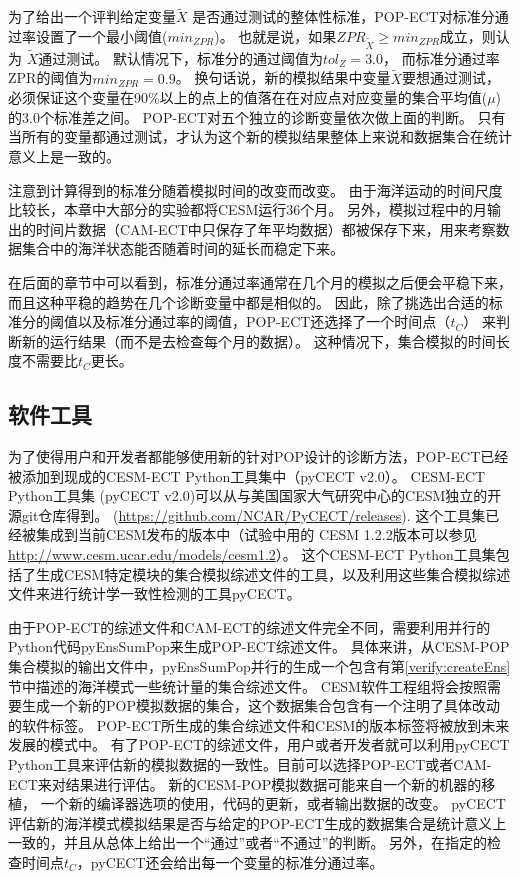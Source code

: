 为了给出一个评判给定变量$\tilde{X}$ 是否通过测试的整体性标准，POP-ECT对标准分通过率设置了一个最小阈值($min_{ZPR}$)。 
也就是说，如果$ZPR_{\tilde{X}} \geq min_{ZPR}$成立，则认为 $\tilde{X}$通过测试。
默认情况下，标准分的通过阈值为$tol_{Z} = 3.0$， 而标准分通过率ZPR的阈值为$min_{ZPR} = 0.9$。 
换句话说，新的模拟结果中变量$\tilde{X}$要想通过测试，必须保证这个变量在90$\%$以上的点上的值落在在对应点对应变量的集合平均值($\mu$) 的$3.0$个标准差之间。
POP-ECT对五个独立的诊断变量依次做上面的判断。 
只有当所有的变量都通过测试，才认为这个新的模拟结果整体上来说和数据集合在统计意义上是一致的。


 
注意到计算得到的标准分随着模拟时间的改变而改变。 
由于海洋运动的时间尺度比较长，本章中大部分的实验都将CESM运行36个月。
另外，模拟过程中的月输出的时间片数据（CAM-ECT中只保存了年平均数据）都被保存下来，用来考察数据集合中的海洋状态能否随着时间的延长而稳定下来。 



在后面的章节中可以看到，标准分通过率通常在几个月的模拟之后便会平稳下来，而且这种平稳的趋势在几个诊断变量中都是相似的。 
因此，除了挑选出合适的标准分的阈值以及标准分通过率的阈值，POP-ECT还选择了一个时间点（$t_C$）
来判断新的运行结果（而不是去检查每个月的数据）。 
这种情况下，集合模拟的时间长度不需要比$t_C$更长。 

\subsection{软件工具}
\label{verify:ECTsoft}

为了使得用户和开发者都能够使用新的针对POP设计的诊断方法，POP-ECT已经被添加到现成的CESM-ECT Python工具集中（pyCECT v2.0）。
CESM-ECT Python工具集 (pyCECT v2.0)可以从与美国国家大气研究中心的CESM独立的开源git仓库得到。 (\url{https://github.com/NCAR/PyCECT/releases}). 
这个工具集已经被集成到当前CESM发布的版本中（试验中用的 CESM 1.2.2版本可以参见\url{http://www.cesm.ucar.edu/models/cesm1.2}）。
这个CESM-ECT Python工具集包括了生成CESM特定模块的集合模拟综述文件的工具，以及利用这些集合模拟综述文件来进行统计学一致性检测的工具pyCECT。

由于POP-ECT的综述文件和CAM-ECT的综述文件完全不同，需要利用并行的Python代码pyEnsSumPop来生成POP-ECT综述文件。
具体来讲，从CESM-POP集合模拟的输出文件中，pyEnsSumPop并行的生成一个包含有第\ref{verify:createEns}节中描述的海洋模式一些统计量的集合综述文件。 
CESM软件工程组将会按照需要生成一个新的POP模拟数据的集合，这个数据集合包含有一个注明了具体改动的软件标签。
POP-ECT所生成的集合综述文件和CESM的版本标签将被放到未来发展的模式中。 
有了POP-ECT的综述文件，用户或者开发者就可以利用pyCECT Python工具来评估新的模拟数据的一致性。目前可以选择POP-ECT或者CAM-ECT来对结果进行评估。
新的CESM-POP模拟数据可能来自一个新的机器的移植， 一个新的编译器选项的使用，代码的更新，或者输出数据的改变。
pyCECT评估新的海洋模式模拟结果是否与给定的POP-ECT生成的数据集合是统计意义上一致的，并且从总体上给出一个“通过”或者“不通过”的判断。
另外，在指定的检查时间点$t_C$，pyCECT还会给出每一个变量的标准分通过率。 

